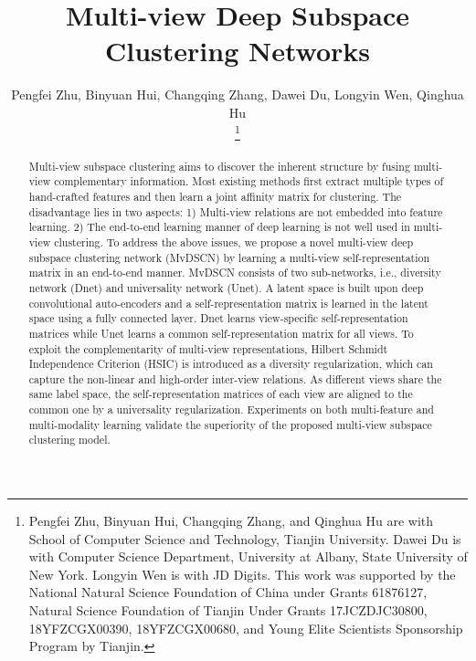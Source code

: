 \documentclass[journal]{IEEEtran}
\begin{document}
\title{Multi-view Deep Subspace Clustering Networks}


\author{Pengfei Zhu, Binyuan Hui, Changqing Zhang, Dawei Du, Longyin Wen, Qinghua Hu

\thanks{Pengfei Zhu, Binyuan Hui, Changqing Zhang, and Qinghua Hu are with School of Computer Science and Technology, Tianjin University.
Dawei Du is with Computer Science Department, University at Albany, State University of New York. 
Longyin Wen is with JD Digits.
This work was supported by the National Natural Science Foundation of China under Grants 61876127, Natural Science Foundation of Tianjin Under Grants 17JCZDJC30800, 18YFZCGX00390, 18YFZCGX00680, and Young  Elite  Scientists   Sponsorship  Program by Tianjin.
}}


\maketitle

\begin{abstract}
Multi-view subspace clustering aims to discover the inherent structure by fusing multi-view complementary information.
Most existing methods first extract multiple types of hand-crafted features and then learn a joint affinity matrix for clustering.
The disadvantage lies in two aspects: 1) Multi-view relations are not embedded into feature learning. 2) The end-to-end learning manner of deep learning is not well used in multi-view clustering.
To address the above issues, we propose a novel multi-view deep subspace clustering network (MvDSCN) by learning a multi-view self-representation matrix in an end-to-end manner.
MvDSCN consists of two sub-networks, i.e., diversity network (Dnet) and universality network (Unet).
A latent space is built upon deep convolutional auto-encoders and a self-representation matrix is learned in the latent space using a fully connected layer.
Dnet learns view-specific self-representation matrices while Unet learns a common self-representation matrix for all views.
To exploit the complementarity of multi-view representations, Hilbert Schmidt Independence Criterion (HSIC) is introduced as a diversity regularization, which can capture the non-linear and high-order inter-view relations.
As different views share the same label space, the self-representation matrices of each view are aligned to the common one by a universality regularization.
Experiments on both multi-feature and multi-modality learning validate the superiority of the proposed multi-view subspace clustering model.
\end{abstract}
\end{document}
